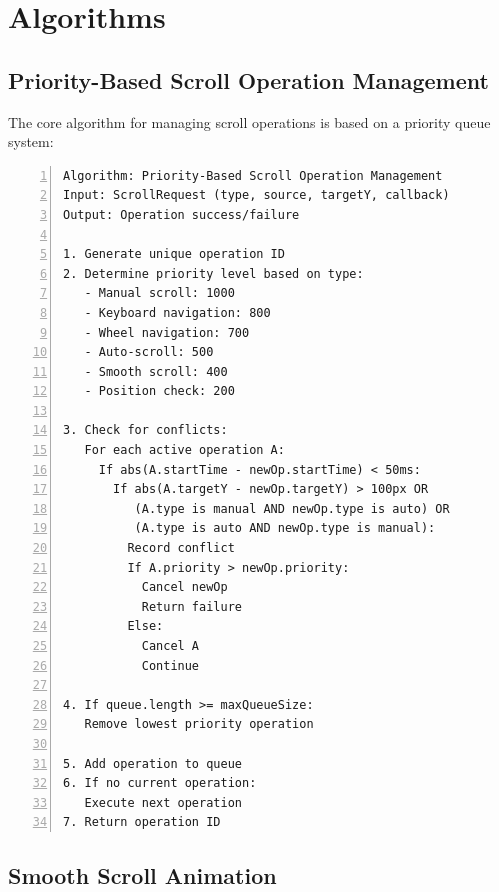 \documentclass[10pt]{article}
\begin{document}
\section{Algorithms}

\subsection{Priority-Based Scroll Operation Management}

The core algorithm for managing scroll operations is based on a priority queue system:

\begin{Verbatim}[frame=lines, numbers=left, tabsize=2, fontsize=\small, xleftmargin=1em, xrightmargin=1em, breaklines=true]
Algorithm: Priority-Based Scroll Operation Management
Input: ScrollRequest (type, source, targetY, callback)
Output: Operation success/failure

1. Generate unique operation ID
2. Determine priority level based on type:
   - Manual scroll: 1000
   - Keyboard navigation: 800
   - Wheel navigation: 700
   - Auto-scroll: 500
   - Smooth scroll: 400
   - Position check: 200

3. Check for conflicts:
   For each active operation A:
     If abs(A.startTime - newOp.startTime) < 50ms:
       If abs(A.targetY - newOp.targetY) > 100px OR
          (A.type is manual AND newOp.type is auto) OR
          (A.type is auto AND newOp.type is manual):
         Record conflict
         If A.priority > newOp.priority:
           Cancel newOp
           Return failure
         Else:
           Cancel A
           Continue

4. If queue.length >= maxQueueSize:
   Remove lowest priority operation

5. Add operation to queue
6. If no current operation:
   Execute next operation
7. Return operation ID
\end{Verbatim}

\subsection{Smooth Scroll Animation}
\end{document}

